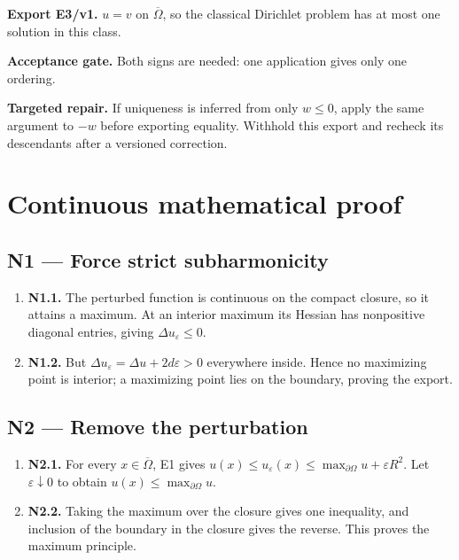 \documentclass[preprint,12pt,aps,pra,showkeys,amsmath,amssymb,superscriptaddress,floatfix]{revtex4-2}
\theoremstyle{definition}
\theoremstyle{remark}
\newcommand{\field}[2]{\par\smallskip\noindent\textbf{#1.} #2\par}
\begin{document}
\field{Export E3/v1}{\(u=v\) on \(\overline\Omega\), so the classical Dirichlet problem has
at most one solution in this class.}

\field{Acceptance gate}{Both signs are needed: one application gives only one ordering.}

\field{Targeted repair}{If uniqueness is inferred from only \(w\le0\), apply the same argument
to \(-w\) before exporting equality. Withhold this export and recheck
its descendants after a versioned correction.}

\endgroup\clearpage\section{Continuous mathematical proof}\label{sec:proof}

\subsection{N1 --- Force strict
subharmonicity}\label{n1-force-strict-subharmonicity}

\begin{enumerate}
\def\labelenumi{\arabic{enumi}.}
\item
  \textbf{N1.1.} The perturbed function is continuous on the compact
  closure, so it attains a maximum. At an interior maximum its Hessian
  has nonpositive diagonal entries, giving \(\Delta u_\varepsilon\le0\).
\item
  \textbf{N1.2.} But \(\Delta u_\varepsilon=\Delta u+2d\varepsilon>0\)
  everywhere inside. Hence no maximizing point is interior; a maximizing
  point lies on the boundary, proving the export.
\end{enumerate}

\subsection{N2 --- Remove the
perturbation}\label{n2-remove-the-perturbation}

\begin{enumerate}
\def\labelenumi{\arabic{enumi}.}
\item
  \textbf{N2.1.} For every \(x\in\overline\Omega\), E1 gives
  \(u(x)\le u_\varepsilon(x)\le\max_{\partial\Omega}u+\varepsilon R^2\).
  Let \(\varepsilon\downarrow0\) to obtain
  \(u(x)\le\max_{\partial\Omega}u\).
\item
  \textbf{N2.2.} Taking the maximum over the closure gives one
  inequality, and inclusion of the boundary in the closure gives the
  reverse. This proves the maximum principle.
\end{enumerate}
\end{document}
